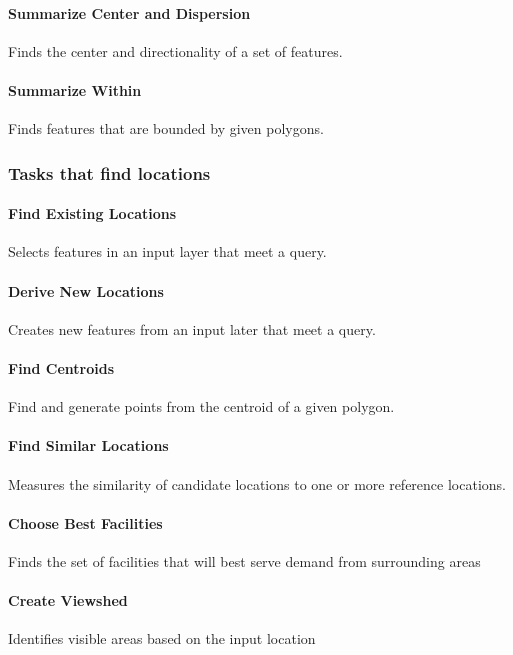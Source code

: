 \documentclass{vgtc}                          %
\begin{document}
\paragraph{Summarize Center and Dispersion}
Finds the center and directionality of a set of features. 

\paragraph{Summarize Within}
Finds features that are bounded by given polygons. 




\subsubsection{Tasks that find locations}

\paragraph{Find Existing Locations}
Selects features in an input layer that meet a query.

\paragraph{Derive New Locations}
Creates new features from an input later that meet a query.

\paragraph{Find Centroids}
Find and generate points from the centroid of a given polygon.

\paragraph{Find Similar Locations}
Measures the similarity of candidate locations to one or more reference locations.

\paragraph{Choose Best Facilities}
Finds the set of facilities that will best serve demand from surrounding areas

\paragraph{Create Viewshed}
Identifies visible areas based on the input location
\end{document}
